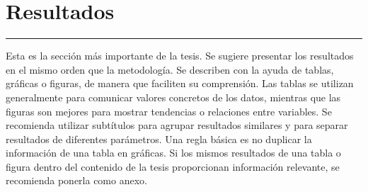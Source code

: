 \chapter{Resultados}\label{capit:cap3}
\vspace{-2.0325ex}%
\noindent
\rule{\textwidth}{0.5pt}
\vspace{-5.5ex}%
\newcommand{\pushline}{\Indp}%

Esta es la sección más importante de la tesis. Se sugiere presentar los resultados en el mismo orden que la metodología. Se describen con la ayuda de tablas, gráficas o figuras, de manera que faciliten su comprensión. Las tablas se utilizan generalmente para comunicar valores concretos de los datos, mientras que las figuras son mejores para mostrar tendencias o relaciones entre variables. Se recomienda utilizar subtítulos para agrupar resultados similares y para separar resultados de diferentes parámetros. Una regla básica es no duplicar la información de una tabla en gráficas. Si los mismos resultados de una tabla o figura dentro del contenido de la tesis proporcionan información relevante, se recomienda ponerla como anexo. 

\begin{table}[ht]
\centering
{}
\caption{Esquema de codificación.}
\label{codschema}
\end{table}

	
\newpage

